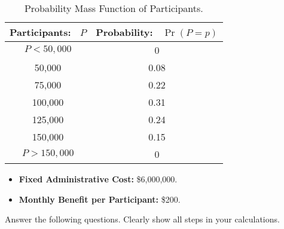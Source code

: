 \documentclass{article}
\begin{document}
\begin{table}[h!] 
\centering 
\begin{tabular}{c|c} 
\hline 
Participants: \ $P$ & Probability: \ $\Pr(P = p)$ \\
\hline 
$P < 50,000$ & 0 \\ 50,000 & 0.08 \\ 75,000 & 0.22 \\ 100,000 & 0.31 \\ 125,000 & 0.24 \\ 150,000 & 0.15 \\ $P > 150,000$ & 0 \\ 
\hline 
\end{tabular} 
\caption{Probability Mass Function of Participants.} 
\end{table} 

\begin{itemize} 
\item \textbf{Fixed Administrative Cost:} \$6,000,000. 
\item \textbf{Monthly Benefit per Participant:} \$200. 
\end{itemize}

\noindent Answer the following questions. Clearly show all steps in your calculations.
\end{document}
